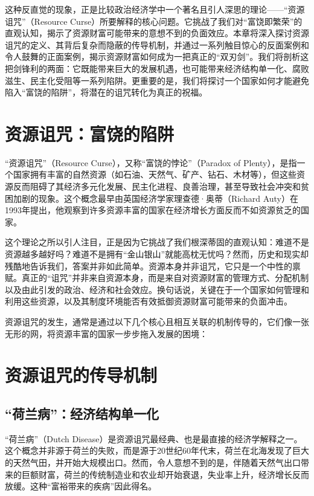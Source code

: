 这种反直觉的现象，正是比较政治经济学中一个著名且引人深思的理论——“资源诅咒”（Resource Curse）所要解释的核心问题。它挑战了我们对“富饶即繁荣”的直观认知，揭示了资源财富可能带来的意想不到的负面效应。本章将深入探讨资源诅咒的定义、其背后复杂而隐蔽的传导机制，并通过一系列触目惊心的反面案例和令人鼓舞的正面案例，揭示资源财富如何成为一把真正的“双刃剑”。我们将剖析这把剑锋利的两面：它既能带来巨大的发展机遇，也可能带来经济结构单一化、腐败滋生、民主化受阻等一系列陷阱。更重要的是，我们将探讨一个国家如何才能避免陷入“富饶的陷阱”，将潜在的诅咒转化为真正的祝福。

\section{资源诅咒：富饶的陷阱}

“资源诅咒”（Resource Curse），又称“富饶的悖论”（Paradox of Plenty），是指一个国家拥有丰富的自然资源（如石油、天然气、矿产、钻石、木材等），但这些资源反而阻碍了其经济多元化发展、民主化进程、良善治理，甚至导致社会冲突和贫困加剧的现象。这个概念最早由英国经济学家理查德·奥蒂（Richard Auty）在1993年提出，他观察到许多资源丰富的国家在经济增长方面反而不如资源贫乏的国家。

这个理论之所以引人注目，正是因为它挑战了我们根深蒂固的直观认知：难道不是资源越多越好吗？难道不是拥有“金山银山”就能高枕无忧吗？然而，历史和现实却残酷地告诉我们，答案并非如此简单。资源本身并非诅咒，它只是一个中性的禀赋。真正的“诅咒”并非来自资源本身，而是来自对资源财富的管理方式、分配机制以及由此引发的政治、经济和社会效应。换句话说，关键在于一个国家如何管理和利用这些资源，以及其制度环境能否有效抵御资源财富可能带来的负面冲击。

资源诅咒的发生，通常是通过以下几个核心且相互关联的机制传导的，它们像一张无形的网，将资源丰富的国家一步步拖入发展的困境：

\section{资源诅咒的传导机制}

\subsection{ “荷兰病”：经济结构单一化}

“荷兰病”（Dutch Disease）是资源诅咒最经典、也是最直接的经济学解释之一。这个概念并非源于荷兰的失败，而是源于20世纪60年代末，荷兰在北海发现了巨大的天然气田，并开始大规模出口。然而，令人意想不到的是，伴随着天然气出口带来的巨额财富，荷兰的传统制造业和农业却开始衰退，失业率上升，经济增长反而放缓。这种“富裕带来的疾病”因此得名。

